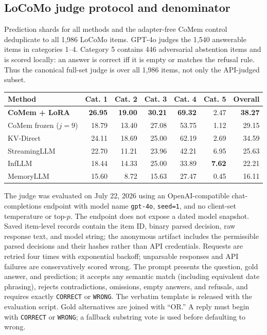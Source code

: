\subsection{LoCoMo judge protocol and denominator}
Prediction shards for all methods and the adapter-free CoMem control deduplicate
to all 1,986 LoCoMo items.
GPT-4o judges the 1,540 answerable items in categories 1--4. Category 5 contains
446 adversarial abstention items and is scored locally: an answer is correct iff
it is empty or matches the refusal rule. Thus the canonical full-set judge is
over all 1,986 items, not only the API-judged subset.

\begin{center}
\small
\captionsetup{hypcap=false}
\setlength{\tabcolsep}{3.5pt}
\begin{tabular}{@{}lrrrrrr@{}}
\toprule
\textbf{Method} & \textbf{Cat. 1} & \textbf{Cat. 2} & \textbf{Cat. 3} & \textbf{Cat. 4} & \textbf{Cat. 5} & \textbf{Overall} \\
\midrule
\textbf{CoMem + LoRA} & \textbf{26.95} & \textbf{19.00} & \textbf{30.21} & \textbf{69.32} & 2.47 & \textbf{38.27} \\
CoMem frozen ($j{=}9$) & 18.79 & 13.40 & 27.08 & 53.75 & 1.12 & 29.15 \\
KV-Direct & 24.11 & 18.69 & 25.00 & 62.19 & 2.69 & 34.59 \\
StreamingLLM & 22.70 & 11.21 & 23.96 & 42.21 & 6.95 & 25.63 \\
InfLLM & 18.44 & 14.33 & 25.00 & 33.89 & \textbf{7.62} & 22.21 \\
MemoryLLM & 15.60 & 8.72 & 15.63 & 27.47 & 0.45 & 16.11 \\
\bottomrule
\end{tabular}
\label{tab:locomo-categories}
\end{center}

The judge was evaluated on July 22, 2026 using an OpenAI-compatible
chat-completions endpoint with model name \texttt{gpt-4o}, \texttt{seed=1}, and
no client-set temperature or top-$p$. The endpoint does not expose a dated
model snapshot. Saved item-level records contain the item ID, binary parsed
decision, raw response text, and model string; the anonymous artifact includes
the permissible parsed decisions and their hashes rather than API credentials.
Requests are retried four
times with exponential backoff; unparsable responses and API failures are
conservatively scored wrong. The prompt presents the question, gold answer, and prediction; it accepts any
semantic match (including equivalent date phrasing), rejects contradictions,
omissions, empty answers, and refusals, and requires exactly
\texttt{CORRECT} or \texttt{WRONG}. The verbatim template is released with the
evaluation script.
Gold alternatives are joined with ``OR.'' A reply must begin with
\texttt{CORRECT} or \texttt{WRONG}; a fallback substring vote is used before
defaulting to wrong.

